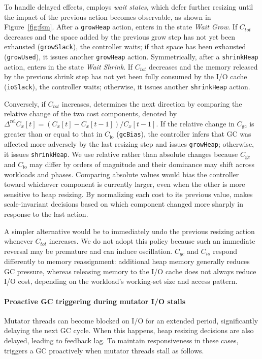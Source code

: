 To handle delayed effects, \flexheapName{} employs \emph{wait states}, which defer further resizing until the impact of the previous action becomes observable, as shown in Figure~\ref{fig:fsm}.
After a \texttt{growHeap} action, \flexheapName{} enters in the state \emph{Wait Grow}.
If $C_\mathit{tot}$ decreases and the space added by the previous grow step has not yet been exhausted (\texttt{growSlack}), the controller waits; if that space has been exhausted (\texttt{growUsed}), it issues another \texttt{growHeap} action.
Symmetrically, after a \texttt{shrinkHeap} action, \flexheapName{} enters in the state \emph{Wait Shrink}.
If $C_\mathit{tot}$ decreases and the memory released by the previous shrink step has not yet been fully consumed by the I/O cache (\texttt{ioSlack}), the controller waits; otherwise, it issues another \texttt{shrinkHeap} action.

Conversely, if $C_\mathit{tot}$ increases, \flexheapName{} determines the next direction by comparing the relative change of the two cost components, denoted by $\Delta^{\mathrm{rel}} C_x[t] = (C_x[t] - C_x[t-1]) / C_x[t-1]$.
If the relative change in $C_\mathrm{gc}$ is greater than or equal to that in $C_\mathrm{io}$ (\texttt{gcBias}), the controller infers that GC was affected more adversely by the last resizing step and issues \texttt{growHeap}; otherwise, it issues \texttt{shrinkHeap}.
We use relative rather than absolute changes because $C_\mathrm{gc}$ and $C_\mathrm{io}$ may differ by orders of magnitude and their dominance may shift across workloads and phases.
Comparing absolute values would bias the controller toward whichever component is currently larger, even when the other is more sensitive to heap resizing.
By normalizing each cost to its previous value, \flexheapName{} makes scale-invariant decisions based on which component changed more sharply in response to the last action.

A simpler alternative would be to immediately undo the previous resizing action whenever $C_\mathit{tot}$ increases.
We do not adopt this policy because such an immediate reversal may be premature and can induce oscillation.
$C_\mathit{gc}$ and $C_\mathit{io}$ respond differently to memory reassignment: additional heap memory generally reduces GC pressure, whereas releasing memory to the I/O cache does not always reduce I/O cost, depending on the workload’s working-set size and access pattern.

\paragraph{\textbf{Proactive GC triggering during mutator I/O stalls}}
Mutator threads can become blocked on I/O for an extended period, significantly delaying the next GC cycle.
When this happens, heap resizing decisions are also delayed, leading to feedback lag.
To maintain responsiveness in these cases, \flexheapName{} triggers a GC proactively when mutator threads stall as follows.

